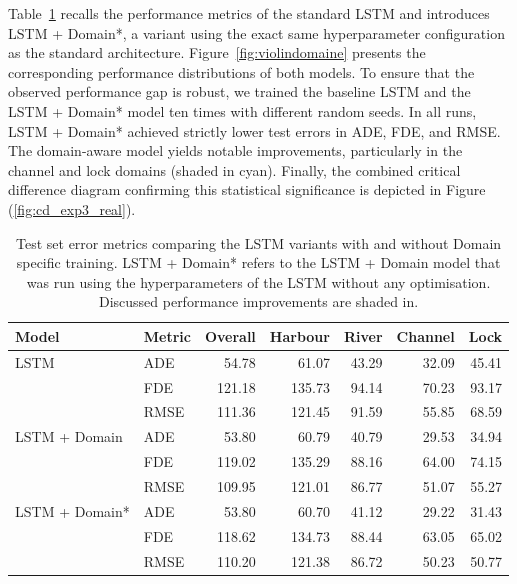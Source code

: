 Table~\ref{tab:results_exp3} recalls the performance metrics of the standard \ac{LSTM} and introduces LSTM + Domain*, a variant using the exact same hyperparameter configuration as the standard architecture.
Figure~\ref{fig:violindomaine} presents the corresponding performance distributions of both models.
To ensure that
the observed performance gap is robust, we trained the baseline LSTM and the LSTM + Domain*
model ten times with different random seeds. In all runs, LSTM + Domain* achieved strictly lower
test errors in \ac{ADE}, \ac{FDE}, and \ac{RMSE}.
The domain-aware model yields notable improvements, particularly in the channel and lock domains (shaded in cyan).
Finally, the combined critical difference diagram confirming this statistical significance is depicted in Figure (\ref{fig:cd_exp3_real}).


\begin{table}[t]
\centering
\caption[Exp. III Error metrics]{Test set error metrics comparing the \acs{LSTM} variants with and without Domain specific training. LSTM + Domain* refers to the LSTM + Domain model that was run using the hyperparameters of the LSTM without any optimisation. Discussed performance improvements are shaded in.}
\label{tab:results_exp3}
\begin{tabular}{llrrrrr}
\toprule
\textbf{Model} & \textbf{Metric} & \textbf{Overall} & \textbf{Harbour} & \textbf{River} & \textbf{Channel} & \textbf{Lock} \\
\midrule
LSTM            & ADE  & 54.78 & 61.07 & 43.29 & 32.09 & 45.41 \\
                & FDE  & 121.18 & 135.73 & 94.14 & 70.23 & 93.17 \\
                & RMSE & 111.36 & 121.45 & 91.59 & 55.85 & 68.59 \\
\midrule
LSTM + Domain   & ADE  & 53.80 & 60.79 & 40.79 & 29.53 & 34.94 \\
                & FDE  & 119.02 & 135.29 & 88.16 & 64.00 & 74.15 \\
                & RMSE & 109.95 & 121.01 & 86.77 & 51.07 & 55.27 \\
\midrule
LSTM + Domain* & ADE  & 53.80 & 60.70 & 41.12 & \cellcolor{cyan!15}29.22 & \cellcolor{cyan!15}31.43 \\
                & FDE  & 118.62 & 134.73 & 88.44 & \cellcolor{cyan!15}63.05 & \cellcolor{cyan!15}65.02 \\
                & RMSE & 110.20 & 121.38 & 86.72 & \cellcolor{cyan!15}50.23 & \cellcolor{cyan!15}50.77 \\
\bottomrule
\end{tabular}
\end{table}

